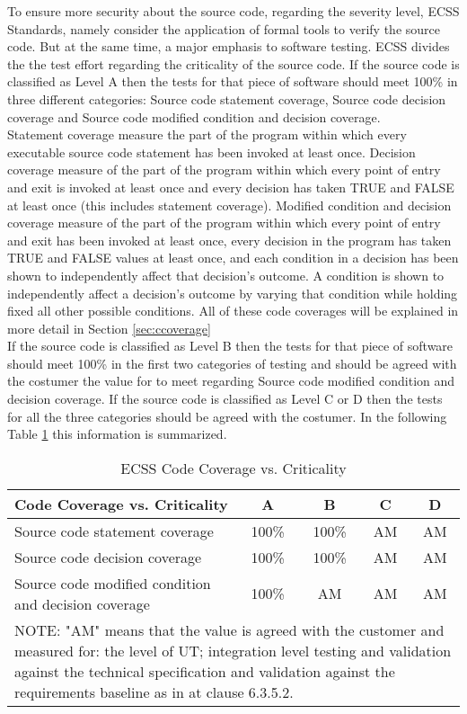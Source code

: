To ensure more security about the source code, regarding the severity level, \ac{ECSS} Standards, namely \cite{ecss-q-st-40c}
consider the application of formal tools to verify the source code. But at the same time, a major emphasis to software testing.
\ac{ECSS} divides the the test effort regarding the criticality of the source code.
If the source code is classified as Level A then the tests for that piece of software should meet 100\% in
three different categories: Source code statement coverage, Source code decision coverage and Source code modified condition and decision coverage.\\
Statement coverage measure the part of the program within which every executable source code statement has been invoked at least once.
Decision coverage measure of the part of the program within which every point of entry and exit
is invoked at least once and every decision has taken TRUE and FALSE
at least once (this includes statement coverage).
Modified condition and decision coverage measure of the part of the program within which every point of entry and exit
has been invoked at least once, every decision in the program has taken TRUE and FALSE values at least once, and each condition in a decision has been
shown to independently affect that decision's outcome. A condition is shown to independently affect a
decision's outcome by varying that condition while holding fixed all other possible conditions. All of these code coverages will be explained in more detail in Section
\ref{sec:ccoverage}\\
If the source code is classified as Level B then the tests for that piece of software should meet 100\% in the first two categories of testing and should be
agreed with the costumer the value for to meet regarding Source code modified condition and decision coverage.
If the source code is classified as Level C or D then the tests for all the three categories should be agreed with the costumer.
In the following Table \ref{tab:ccoverage} this information is summarized.

\begin{table}[!ht]
\centering
\noindent \begin{tabular}{|m{6cm}|c|c|c|c|}
\hline
\textbf{Code Coverage vs. Criticality} & A & B & C & D \\\hline
Source code statement coverage & 100\% & 100\% & AM & AM \\\hline
Source code decision coverage & 100\% & 100\% & AM & AM \\\hline
Source code modified condition and decision coverage & 100\% & AM & AM & AM \\\hline
\multicolumn{5}{|m{14cm}|}{
NOTE: "AM" means that the value is agreed with the customer and measured for:
the level of \ac{UT}; integration level testing and validation against the
technical specification and validation against the requirements baseline
as in \cite{ecss-q-st-80c} at clause 6.3.5.2.
}\\\hline
\end{tabular}
\caption{ECSS Code Coverage vs. Criticality}\label{tab:ccoverage}
\end{table}


